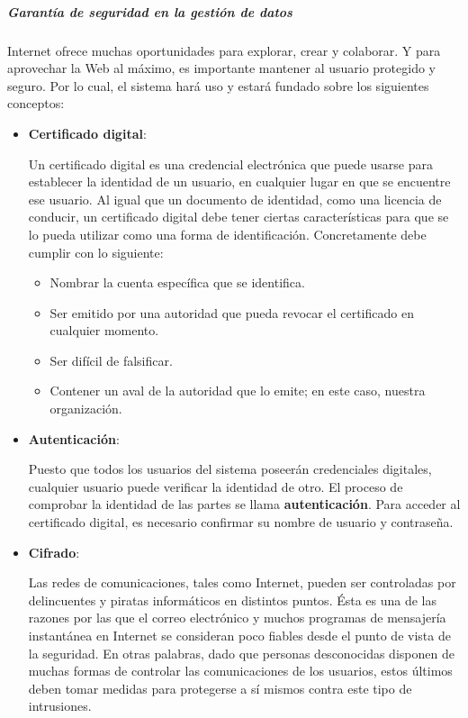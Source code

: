 \subparagraph{Garantía de seguridad en la gestión de datos}
    
    Internet ofrece muchas oportunidades para explorar, crear y colaborar.
    Y para aprovechar la Web al máximo, es importante mantener al usuario protegido y seguro.
    Por lo cual, el sistema hará uso y estará fundado sobre los siguientes conceptos:
    
    \begin{itemize}
    	\item \textbf{Certificado digital}:
    
		Un certificado digital es una credencial electrónica que puede usarse para establecer la identidad de un usuario, en cualquier lugar en que se encuentre ese usuario.
    	Al igual que un documento de identidad, como una licencia de conducir, un certificado digital debe tener ciertas características para que se lo pueda utilizar como una forma de identificación.
	    Concretamente debe cumplir con lo siguiente:
    
		\begin{itemize}
    		\item Nombrar la cuenta específica que se identifica.
		    \item Ser emitido por una autoridad que pueda revocar el certificado en cualquier momento.
		    \item Ser difícil de falsificar.
	    	\item Contener un aval de la autoridad que lo emite; en este caso, nuestra organización.
		\end{itemize}
    
		\item \textbf{Autenticación}:
    
		Puesto que todos los usuarios del sistema poseerán credenciales digitales, cualquier usuario puede verificar la identidad de otro.
	    El proceso de comprobar la identidad de las partes se llama \textbf{autenticación}.
    	Para acceder al certificado digital, es necesario confirmar su nombre de usuario y contraseña.

		\item \textbf{Cifrado}:

		Las redes de comunicaciones, tales como Internet, pueden ser controladas por delincuentes y piratas informáticos en distintos puntos.
	    Ésta es una de las razones por las que el correo electrónico y muchos programas de mensajería instantánea en Internet se consideran poco fiables desde el punto de vista de la seguridad.
    	En otras palabras, dado que personas desconocidas disponen de muchas formas de controlar las comunicaciones de los usuarios, estos últimos deben tomar medidas para protegerse a sí mismos contra este tipo de intrusiones.


\end{itemize}
